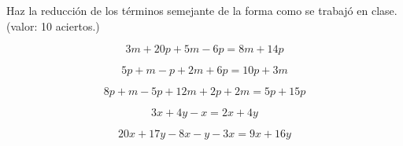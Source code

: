 \documentclass[11pt]{article}
\begin{document}
Haz la reducci\'on de los t\'erminos semejante de la forma como se trabaj\'o en
clase. (valor: 10 aciertos.)

\begin{equation*}
3m + 20p + 5m - 6p =  8m + 14p
\end{equation*}

\vspace{4mm}

\begin{equation*}
5p + m -p +2m + 6p = 10p + 3m
\end{equation*}

\vspace{4mm}

\begin{equation*}
8p + m -5p + 12m + 2p + 2m = 5p + 15p
\end{equation*}

\vspace{4mm}

\begin{equation*}
3x + 4y - x = 2x + 4y
\end{equation*}

\vspace{4mm}

\begin{equation*}
20x + 17y - 8x - y -3x = 9x + 16y
\end{equation*}
\end{document}
